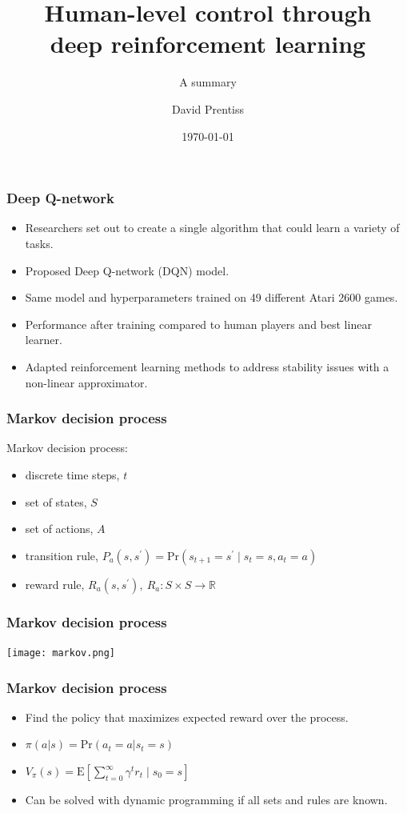 \documentclass{beamer}
\begin{document}
\title{Human-level control through \\ deep reinforcement learning}
\subtitle{A summary}
\author{David Prentiss}
\date{\today}

\frame{\titlepage}

\begin{frame}
  \frametitle{Deep Q-network}
  \begin{itemize}
  \item Researchers set out to create a single algorithm that could learn a
    variety of tasks.
  \item Proposed Deep Q-network (DQN) model.
  \item Same model and hyperparameters trained on 49 different Atari 2600 games.
  \item Performance after training compared to human players and best linear learner.
  \item Adapted reinforcement learning methods to address stability issues
    with a non-linear approximator.
  \end{itemize}
\end{frame}

\begin{frame}
  \frametitle{Markov decision process}
  Markov decision process:
  \begin{itemize}
  \item discrete time steps, \(t\)
  \item set of states, \(S\)
  \item set of actions, \(A\)
  \item transition rule, \(P_a(s,s^\prime)=\text{Pr}(s_{t+1}=s^\prime\mid s_t=s, a_t=a)\)
  \item reward rule, \(R_a(s,s^\prime),\ R_a:S\times S \rightarrow \mathbb{R}\)
  \end{itemize}
\end{frame}

\begin{frame}
  \frametitle{Markov decision process}
  \texttt{[image: markov.png]}
\end{frame}

\begin{frame}
  \frametitle{Markov decision process}
  \begin{itemize}
  \item Find the policy that maximizes expected reward over the process.
  \item \(\pi (a|s)=\text{Pr}(a_{t}=a|s_{t}=s)\)
  \item \(V_\pi(s)=\text{E}\left[
      \sum_{t=0}^\infty\gamma^tr_t\mid s_0=s
    \right]\)
  \item Can be solved with dynamic programming if all sets and rules are
    known.
  \end{itemize}
\end{frame}
\end{document}
